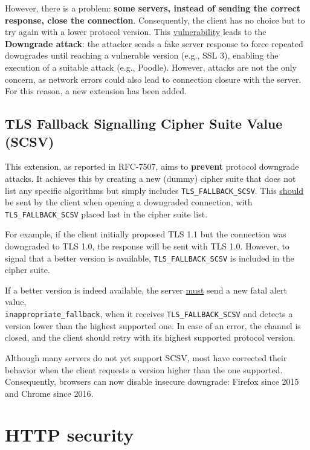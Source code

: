 However, there is a problem: \textbf{some servers, instead of sending the correct response, close the connection}. Consequently, the client has no choice but to try again with a lower protocol version. This \underline{vulnerability} leads to the \textbf{Downgrade attack}: the attacker sends a fake server response to force repeated downgrades until reaching a vulnerable version (e.g., SSL 3), enabling the execution of a suitable attack (e.g., Poodle). However, attacks are not the only concern, as network errors could also lead to connection closure with the server. For this reason, a new extension has been added.

\subsection{TLS Fallback Signalling Cipher Suite Value (SCSV)}

This extension, as reported in RFC-7507, aims to \textbf{prevent} protocol downgrade attacks. It achieves this by creating a new (dummy) cipher suite that does not list any specific algorithms but simply includes \texttt{TLS\_FALLBACK\_SCSV}. This \underline{should} be sent by the client when opening a downgraded connection, with \texttt{TLS\_FALLBACK\_SCSV} placed last in the cipher suite list.

For example, if the client initially proposed TLS 1.1 but the connection was downgraded to TLS 1.0, the response will be sent with TLS 1.0. However, to signal that a better version is available, \texttt{TLS\_FALLBACK\_SCSV} is included in the cipher suite.

If a better version is indeed available, the server \underline{must} send a new fatal alert value, \\ \texttt{inappropriate\_fallback}, when it receives \texttt{TLS\_FALLBACK\_SCSV} and detects a version lower than the highest supported one.
In case of an error, the channel is closed, and the client should retry with its highest supported protocol version.

Although many servers do not yet support SCSV, most have corrected their behavior when the client requests a version higher than the one supported. Consequently, browsers can now disable insecure downgrade: Firefox since 2015 and Chrome since 2016.



\section{HTTP security}

